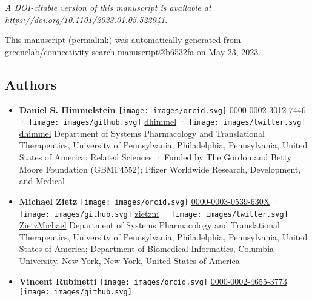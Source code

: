\emph{A DOI-citable version of this manuscript is available at \url{https://doi.org/10.1101/2023.01.05.522941}}.

This manuscript
(\href{https://greenelab.github.io/connectivity-search-manuscript/v/b6532fafbc126c0818c612febf86968e6fa8e21b/}{permalink})
was automatically generated
from \href{https://github.com/greenelab/connectivity-search-manuscript/tree/b6532fafbc126c0818c612febf86968e6fa8e21b}{greenelab/connectivity-search-manuscript@b6532fa}
on May 23, 2023.

\hypertarget{authors}{%
\subsection{Authors}\label{authors}}

\begin{itemize}
\item
  \textbf{Daniel S. Himmelstein}
  \texttt{[image: images/orcid.svg]}
  \href{https://orcid.org/0000-0002-3012-7446}{0000-0002-3012-7446}
  · \texttt{[image: images/github.svg]}
  \href{https://github.com/dhimmel}{dhimmel}
  · \texttt{[image: images/twitter.svg]}
  \href{https://twitter.com/dhimmel}{dhimmel}
  Department of Systems Pharmacology and Translational Therapeutics, University of Pennsylvania, Philadelphia, Pennsylvania, United States of America; Related Sciences
  · Funded by The Gordon and Betty Moore Foundation (GBMF4552); Pfizer Worldwide Research, Development, and Medical
\item
  \textbf{Michael Zietz}
  \texttt{[image: images/orcid.svg]}
  \href{https://orcid.org/0000-0003-0539-630X}{0000-0003-0539-630X}
  · \texttt{[image: images/github.svg]}
  \href{https://github.com/zietzm}{zietzm}
  · \texttt{[image: images/twitter.svg]}
  \href{https://twitter.com/ZietzMichael}{ZietzMichael}
  Department of Systems Pharmacology and Translational Therapeutics, University of Pennsylvania, Philadelphia, Pennsylvania, United States of America; Department of Biomedical Informatics, Columbia University, New York, New York, United States of America
\item
  \textbf{Vincent Rubinetti}
  \texttt{[image: images/orcid.svg]}
  \href{https://orcid.org/0000-0002-4655-3773}{0000-0002-4655-3773}
  · \texttt{[image: images/github.svg]}

\end{itemize}
